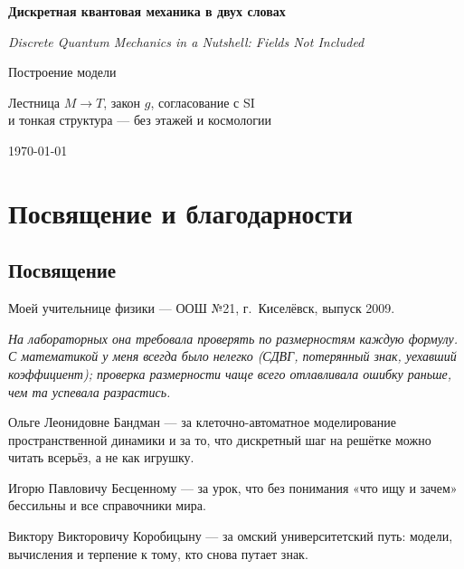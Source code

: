 \begin{titlepage}
  \centering
  \vspace*{2cm}
  {\LARGE\bfseries Дискретная квантовая механика в двух словах\par}
  \vspace{0.35cm}
  {\normalsize\itshape Discrete Quantum Mechanics in a Nutshell: Fields Not Included\par}
  \vspace{0.6cm}
  {\Large Построение модели\par}
  \vspace{1.0cm}
  {\large Лестница $M\to T$, закон $g$, согласование с SI\\
  и тонкая структура --- без этажей и космологии\par}
  \vspace{1.2cm}
  {\large \bookauthorfullname\par}
  \vfill
  {\large \today\par}
\end{titlepage}

\tableofcontents
\cleardoublepage

\chapter*{Посвящение и благодарности}

\section*{Посвящение}

\noindent
Моей учительнице физики --- ООШ №21, г.~Киселёвск, выпуск 2009.

\medskip
\noindent\itshape
На лабораторных она требовала проверять по размерностям каждую формулу.
С математикой у меня всегда было нелегко (СДВГ, потерянный знак, уехавший коэффициент);
проверка размерности чаще всего отлавливала ошибку раньше, чем та успевала разрастись.
\normalfont

\medskip
\noindent
Ольге Леонидовне Бандман --- за клеточно-автоматное моделирование пространственной динамики
и за то, что дискретный шаг на решётке можно читать всерьёз, а не как игрушку.

\medskip
\noindent
Игорю Павловичу Бесценному --- за урок, что без понимания «что ищу и зачем» бессильны и все справочники мира.

\medskip
\noindent
Виктору Викторовичу Коробицыну --- за омский университетский путь: модели, вычисления
и терпение к тому, кто снова путает знак.

